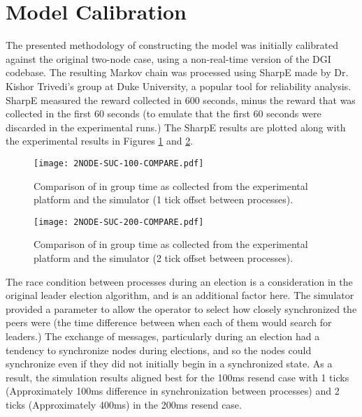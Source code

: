 \section{Model Calibration}

The presented methodology of constructing the model was initially calibrated against the
original two-node case, using a non-real-time version of the DGI codebase. The resulting
Markov chain was processed using SharpE \cite{SHARPE}\cite{SHARPE2} made by Dr. Kishor
Trivedi's group at Duke University, a popular tool for reliability analysis. SharpE measured the reward collected in 600 seconds,
minus the reward that was collected in the first 60 seconds (to emulate that the first
60 seconds were discarded in the experimental runs.) The SharpE results are plotted along
with the experimental results in Figures \ref{fig:COMPARE-SUC-2NODE-100} and \ref{fig:COMPARE-SUC-2NODE-200}.

\begin{figure}[!h]
\centering
\texttt{[image: 2NODE-SUC-100-COMPARE.pdf]}
\caption{Comparison of in group time as collected from the experimental platform and the simulator (1 tick offset between processes).}
\label{fig:COMPARE-SUC-2NODE-100}
\end{figure}


\begin{figure}[!h]
\centering
\texttt{[image: 2NODE-SUC-200-COMPARE.pdf]}

\caption{Comparison of in group time as collected from the experimental platform and the simulator (2 tick offset between processes).}
\label{fig:COMPARE-SUC-2NODE-200}
\end{figure}

The race condition between processes during an election is a consideration in the original
leader election algorithm, and is an additional factor here. The simulator provided a parameter
to allow the operator to select how closely synchronized the peers were (the time difference
between when each of them would search for leaders.) The exchange of messages, particularly
during an election had a tendency to synchronize nodes during elections, and so the nodes could
synchronize even if they did not initially begin in a synchronized state. As a result, the
simulation results aligned best for the 100ms resend case with 1 ticks (Approximately 100ms
difference in synchronization between processes) and 2 ticks (Approximately 400ms) in the 200ms
resend case.

